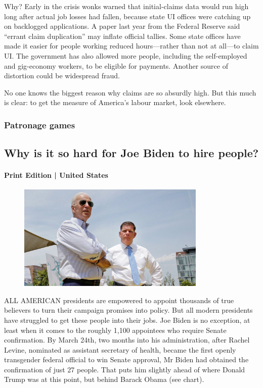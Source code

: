 \documentclass{article}
\begin{document}
Why? Early in the crisis wonks warned that initial-claims data would run high long after actual job losses had fallen, because state UI offices were catching up on backlogged applications. A paper last year from the Federal Reserve said ``errant claim duplication'' may inflate official tallies. Some state offices have made it easier for people working reduced hours---rather than not at all---to claim UI. The government has also allowed more people, including the self-employed and gig-economy workers, to be eligible for payments. Another source of distortion could be widespread fraud. 

No one knows the biggest reason why claims are so absurdly high. But this much is clear: to get the measure of America's labour market, look elsewhere. 
\clearpage
\subsubsection{Patronage games }
\subsection{Why is it so hard for Joe Biden to hire people? }
\paragraph{Print Edition | United States  \quad \color{gray}{Mar 25th 2021 }}
\begin{figure}[h]
\centering
\includegraphics[width=0.8\textwidth]{images/20210320_usp505_0.jpg}
\end{figure}
\lettrine{A}LL AMERICAN presidents are empowered to appoint thousands of true believers to turn their campaign promises into policy. But all modern presidents have struggled to get these people into their jobs. Joe Biden is no exception, at least when it comes to the roughly 1,100 appointees who require Senate confirmation. By March 24th, two months into his administration, after Rachel Levine, nominated as assistant secretary of health, became the first openly transgender federal official to win Senate approval, Mr Biden had obtained the confirmation of just 27 people. That puts him slightly ahead of where Donald Trump was at this point, but behind Barack Obama (see chart). 
\end{document}
